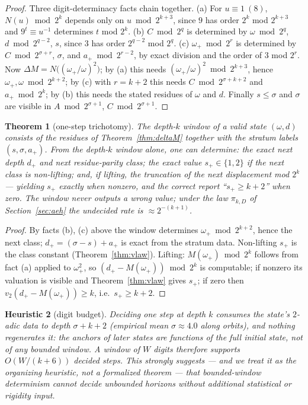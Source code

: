 \documentclass[11pt]{article}
\newtheorem{theorem}{Theorem}[section]
\newtheorem{heuristic}[theorem]{Heuristic}
\theoremstyle{remark}
\newcommand{\vt}[1]{v_2\!\left(#1\right)}
\newcommand{\w}{\omega}
\newcommand{\wnext}{\w_{+}}
\newcommand{\dnext}{d_{+}}
\begin{document}
\begin{proof}
Three digit-determinacy facts chain together. (a) For $u \equiv 1\ (8)$, $N(u) \bmod 2^k$ depends only on $u \bmod 2^{k+3}$, since $9$ has order $2^k$ mod $2^{k+3}$ and $9^t \equiv u^{-1}$ determines $t$ mod $2^k$. (b) $C \bmod 2^{q}$ is determined by $\w \bmod 2^q$, $d \bmod 2^{q-2}$, $s$, since $3$ has order $2^{q-2}$ mod $2^q$. (c) $\wnext \bmod 2^r$ is determined by $C \bmod 2^{\sigma + r}$, $\sigma$, and $a_+ \bmod 2^{r-2}$, by exact division and the order of $3$ mod $2^r$. Now $\Delta M = N\bigl((\wnext/\w)^2\bigr)$; by (a) this needs $(\wnext/\w)^2 \bmod 2^{k+3}$, hence $\wnext, \w \bmod 2^{k+2}$; by (c) with $r = k+2$ this needs $C \bmod 2^{\sigma+k+2}$ and $a_+ \bmod 2^k$; by (b) this needs the stated residues of $\w$ and $d$. Finally $s \le \sigma$ and $\sigma$ are visible in $A \bmod 2^{\sigma+1}$, $C \bmod 2^{\sigma+1}$.
\end{proof}

\begin{theorem}[one-step trichotomy]\label{thm:onestep}
The \emph{depth-$k$ window} of a valid state $(\w,d)$ consists of the residues of Theorem~\ref{thm:deltaM} together with the stratum labels $(s, \sigma, a_+)$. From the depth-$k$ window alone, one can determine: the exact next depth $\dnext$ and next residue-parity class; the exact value $s_+ \in \{1,2\}$ if the next class is non-lifting; and, if lifting, the truncation of the next displacement mod $2^k$ --- yielding $s_+$ exactly when nonzero, and the correct report ``$s_+ \ge k+2$'' when zero. The window never outputs a wrong value; under the law $\pi_{k,D}$ of Section~\ref{sec:aeh} the undecided rate is $\approx 2^{-(k+1)}$.
\end{theorem}

\begin{proof}
By facts (b), (c) above the window determines $\wnext \bmod 2^{k+2}$, hence the next class; $\dnext = (\sigma - s) + a_+$ is exact from the stratum data. Non-lifting $s_+$ is the class constant (Theorem~\ref{thm:vlaw}). Lifting: $M(\wnext) \bmod 2^k$ follows from fact (a) applied to $\wnext^2$, so $(\dnext - M(\wnext)) \bmod 2^k$ is computable; if nonzero its valuation is visible and Theorem~\ref{thm:vlaw} gives $s_+$; if zero then $\vt{\dnext - M(\wnext)} \ge k$, i.e.\ $s_+ \ge k + 2$.
\end{proof}

\begin{heuristic}[digit budget]\label{prop:budget}
Deciding one step at depth $k$ consumes the state's $2$-adic data to depth $\sigma + k + 2$ (empirical mean $\sigma \approx 4.0$ along orbits), and nothing regenerates it: the anchors of later states are functions of the full initial state, not of any bounded window. A window of $W$ digits therefore supports $O(W/(k+6))$ decided steps. This strongly suggests --- and we treat it as the organizing heuristic, not a formalized theorem --- that bounded-window determinism cannot decide unbounded horizons without additional statistical or rigidity input.
\end{heuristic}
\end{document}
